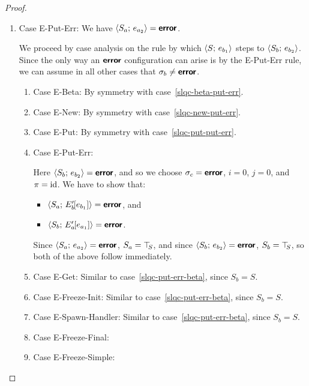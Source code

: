 \begin{proof}
\begin{enumerate}
\begin{enumerate}
    \end{enumerate}
  \item Case {\sc E-Put-Err}: We have $\langle S_a;\, e_{a_2} \rangle =
    \textbf{\textsf{error}}$.

    We proceed by case analysis on the rule by which
    $\langle S;\, e_{b_1} \rangle$ steps to $\langle S_b;\, e_{b_2} \rangle$.  Since the
    only way an $\textbf{\textsf{error}}$ configuration can arise is by the {\sc
      E-Put-Err} rule, we can assume in all other cases that $\sigma_b
    \neq \textbf{\textsf{error}}$.
    \begin{enumerate}
    \item \label{slqc-put-err-beta}Case {\sc E-Beta}: By symmetry with case~\ref{slqc-beta-put-err}.
    \item \label{slqc-put-err-new}Case {\sc E-New}: By symmetry with case~\ref{slqc-new-put-err}.
    \item \label{slqc-put-err-put}Case {\sc E-Put}: By symmetry with case~\ref{slqc-put-put-err}.
    \item \label{slqc-put-err-put-err}Case {\sc E-Put-Err}: 

      Here $\langle S_b;\, e_{b_2} \rangle = \textbf{\textsf{error}}$, and so we choose $\sigma_c
      = \textbf{\textsf{error}}$, $i = 0$, $j = 0$, and $\pi = \mathrm{id}$.  We have to show
      that:
      \begin{itemize}
      \item $\langle S_a;\, E'_b\hspace{-1mm}\left[e_{b_1}\right] \rangle = \textbf{\textsf{error}}$, and
      \item
        $\langle S_b;\, E'_a\hspace{-1mm}\left[e_{a_1}\right] \rangle = \textbf{\textsf{error}}$.
      \end{itemize}

      Since $\langle S_a;\, e_{a_2} \rangle = \textbf{\textsf{error}}$, $S_a = \top\hspace{-0.85mm}_{S}$, and since
      $\langle S_b;\, e_{b_2} \rangle = \textbf{\textsf{error}}$, $S_b = \top\hspace{-0.85mm}_{S}$, so both of the
      above follow immediately.

    \item \label{slqc-put-err-get}Case {\sc E-Get}: Similar to
      case~\ref{slqc-put-err-beta}, since $S_b = S$.
    \item \label{slqc-put-err-freeze-init}Case {\sc E-Freeze-Init}:
      Similar to case~\ref{slqc-put-err-beta}, since $S_b = S$.
    \item \label{slqc-put-err-spawn-handler}Case {\sc E-Spawn-Handler}:
      Similar to case~\ref{slqc-put-err-beta}, since $S_b = S$.
    \item \label{slqc-put-err-freeze-final}Case {\sc E-Freeze-Final}: \TODO{}
    \item \label{slqc-put-err-freeze-simple}Case {\sc E-Freeze-Simple}: \TODO{}


\end{enumerate}
\end{enumerate}
\end{proof}
